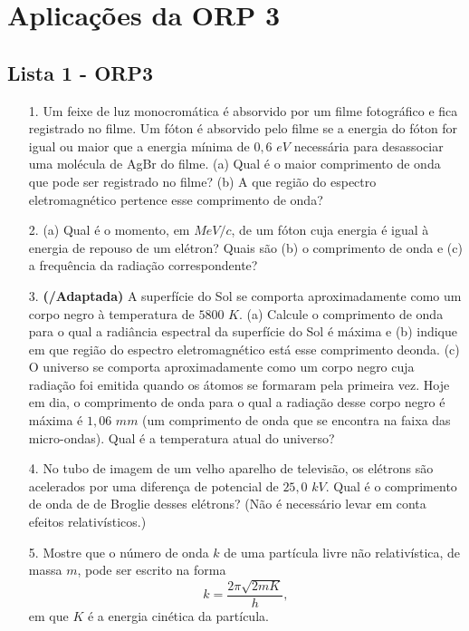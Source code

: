 \chapter{Aplicações da ORP 3} \label{apendice:orp3}
\section{Lista 1 - ORP3}\label{ch:orp3l1}
\begin{itemize}
    \item[1.] \textbf{\cite{halliday}} Um feixe de luz monocromática é absorvido por um filme fotográfico e fica registrado no filme. Um fóton é absorvido pelo filme se a energia do fóton for igual ou maior que a energia mínima de $0,6$ $eV$ necessária para desassociar uma molécula de AgBr do filme. (a) Qual é o maior comprimento de onda que pode ser registrado no filme? (b) A que região do espectro eletromagnético pertence esse comprimento de onda?

    \item[2.] \textbf{\cite{halliday}} (a) Qual é o momento, em $MeV/c$, de um fóton cuja energia é igual à energia de repouso de um elétron? Quais são (b) o comprimento de onda e (c) a frequência da radiação correspondente?

    \item[3.] \textbf{(\cite{halliday}/Adaptada)} A superfície do Sol se comporta aproximadamente como um corpo negro à temperatura de $5800$ $K$. (a) Calcule o comprimento de onda para o qual a radiância espectral da superfície do Sol é máxima e (b) indique em que região do espectro eletromagnético está esse comprimento deonda. (c) O universo se comporta aproximadamente como um corpo negro cuja radiação foi emitida quando os átomos se formaram pela primeira vez. Hoje em dia, o comprimento de onda para o qual a radiação desse corpo negro é máxima é $1,06$ $mm$ (um comprimento de onda que se encontra na faixa das micro-ondas). Qual é a temperatura atual do universo?

    \item[4.] \textbf{\cite{halliday}} No tubo de imagem de um velho aparelho de televisão, os elétrons são acelerados por uma diferença de potencial de $25,0$ $kV$. Qual é o comprimento de onda de de Broglie desses elétrons? (Não é necessário levar em conta efeitos relativísticos.)

    \item[5.] \textbf{\cite{halliday}} Mostre que o número de onda $k$ de uma partícula livre não relativística, de massa $m$, pode ser escrito na forma
    \begin{equation*}
        k = \frac{2 \pi \sqrt{2mK}}{h},
    \end{equation*}
    em que $K$ é a energia cinética da partícula.


\end{itemize}
